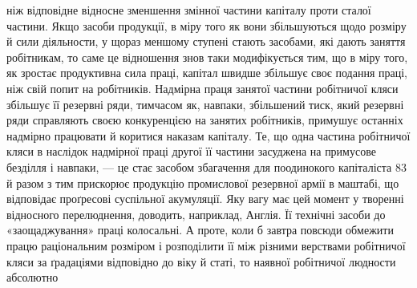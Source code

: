 ніж відповідне відносне зменшення змінної частини капіталу
проти сталої частини. Якщо засоби продукції, в міру того як
вони збільшуються щодо розміру й сили діяльности, у щораз
меншому ступені стають засобами, які дають заняття робітникам,
то саме це відношення знов таки модифікується тим, що в міру
того, як зростає продуктивна сила праці, капітал швидше збільшує
своє подання праці, ніж свій попит на робітників. Надмірна
праця занятої частини робітничої кляси збільшує її резервні
ряди, тимчасом як, навпаки, збільшений тиск, який резервні
ряди справляють своєю конкуренцією на занятих робітників,
примушує останніх надмірно працювати й коритися наказам
капіталу. Те, що одна частина робітничої кляси в наслідок надмірної
праці другої її частини засуджена на примусове безділля
і навпаки, — це стає засобом збагачення для поодинокого капіталіста
83 й разом з тим прискорює продукцію промислової резервної
армії в маштабі, що відповідає проґресові суспільної
акумуляції. Яку вагу має цей момент у творенні відносного перелюднення,
доводить, наприклад, Англія. Її технічні засоби до
«заощаджування» праці колосальні. А проте, коли б завтра
повсюди обмежити працю раціональним розміром і розподілити
її між різними верствами робітничої кляси за ґрадаціями відповідно
до віку й статі, то наявної робітничої людности абсолютно

